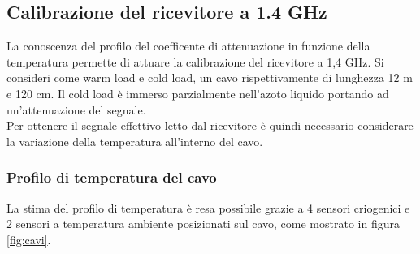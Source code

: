 \label{ssec:Calcolo del coefficiente di attenuazione}

\subsection{Calibrazione del ricevitore a 1.4 GHz}

La conoscenza del profilo del coefficente di attenuazione in funzione della temperatura permette di attuare la calibrazione del ricevitore a 1,4 GHz. Si consideri come warm load e cold load, un cavo rispettivamente di lunghezza 12 m e 120 cm. Il cold load è immerso parzialmente nell'azoto liquido portando ad un'attenuazione del segnale.\\
Per ottenere il segnale effettivo letto dal ricevitore è quindi necessario considerare la variazione della temperatura all'interno del cavo.

\subsubsection{Profilo di temperatura del cavo}
\label{ssec:Profilo di temperatura del cavo}

La stima del profilo di temperatura è resa possibile grazie a 4 sensori criogenici e 2 sensori a temperatura ambiente posizionati sul cavo, come mostrato in figura \ref{fig:cavi}. 

